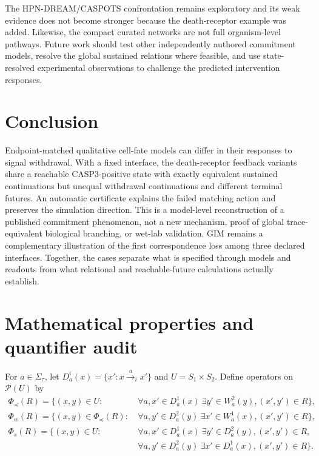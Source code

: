 \documentclass{ws-jbcb}
\numberwithin{equation}{section}
\newcommand{\TAU}{\tau}
\newcommand{\powerset}{\mathcal{P}}
\begin{document}
The HPN-DREAM/CASPOTS confrontation remains exploratory and its weak evidence
does not become stronger because the death-receptor example was added.
Likewise, the compact curated networks are not full organism-level pathways.
Future work should test other independently authored commitment models,
resolve the global sustained relations where feasible, and use state-resolved
experimental observations to challenge the predicted intervention responses.

\section{Conclusion}\label{sec:conclusion}

Endpoint-matched qualitative cell-fate models can differ in their responses to
signal withdrawal. With a fixed interface, the death-receptor feedback variants
share a reachable CASP3-positive state with exactly equivalent sustained
continuations but unequal withdrawal continuations and different terminal
futures. An automatic certificate explains the failed matching action and
preserves the simulation direction. This is a model-level reconstruction of a
published commitment phenomenon, not a new mechanism, proof of global
trace-equivalent biological branching, or wet-lab validation. GIM remains a
complementary illustration of the first correspondence loss among three
declared interfaces. Together, the cases separate what is specified through
models and readouts from what relational and reachable-future calculations
actually establish.

\appendix
\section{Mathematical properties and quantifier audit}\label{app:formal}
\label{sec:fixed-point}

For $a\in\Sigma_{\TAU}$, let $D_a^i(x)=\{x':x\xrightarrow{a}_i x'\}$ and
$U=S_1\times S_2$. Define operators on $\powerset(U)$ by
\begin{align}
\Phi_{\preceq}(R)=\{(x,y)\in U:
 &\ \forall a,x'\in D_a^1(x)\ \exists y'\in W_a^2(y),
 (x',y')\in R\},\label{eq:sim-operator}\\
\Phi_w(R)=\{(x,y)\in\Phi_{\preceq}(R):
 &\ \forall a,y'\in D_a^2(y)\ \exists x'\in W_a^1(x),
 (x',y')\in R\},\label{eq:weak-bisim-operator}\\
\Phi_s(R)=\{(x,y)\in U:
 &\ \forall a,x'\in D_a^1(x)\ \exists y'\in D_a^2(y),
 (x',y')\in R,\nonumber\\
 &\ \forall a,y'\in D_a^2(y)\ \exists x'\in D_a^1(x),
 (x',y')\in R\}.\label{eq:strong-bisim-operator}
\end{align}
\end{document}
